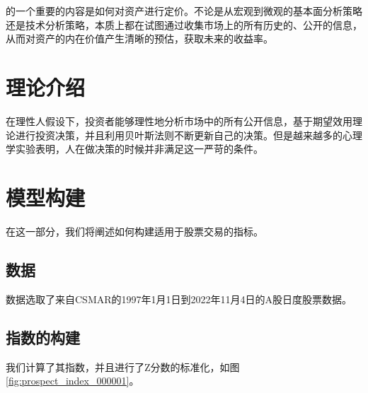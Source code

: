 \documentclass[a4paper,12pt]{report}
\begin{document}
\newpage

\setcounter{page}{1}
\tableofcontents %
\newpage

\chapter*{ \heiti \MYTITLE}
\setcounter{page}{1}
的一个重要的内容是如何对资产进行定价。不论是从宏观到微观的基本面分析策略还是技术分析策略，本质上都在试图通过收集市场上的所有历史的、公开的信息，从而对资产的内在价值产生清晰的预估，获取未来的收益率。

\chapter{理论介绍}
在理性人假设下，投资者能够理性地分析市场中的所有公开信息，基于期望效用理论进行投资决策，并且利用贝叶斯法则不断更新自己的决策。但是越来越多的心理学实验表明，人在做决策的时候并非满足这一严苛的条件。

\chapter{模型构建}
在这一部分，我们将阐述如何构建适用于股票交易的指标。

\section{数据}
数据选取了来自CSMAR的1997年1月1日到2022年11月4日的A股日度股票数据。

\section{指数的构建}
我们计算了其指数，并且进行了Z分数的标准化，如图\ref{fig:prospect_index_000001}。
\end{document}
